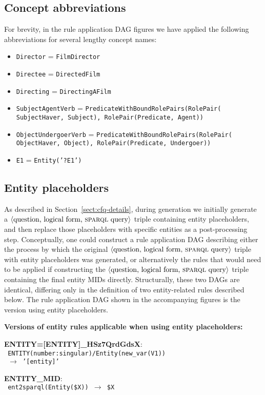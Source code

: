 \documentclass[letterpaper]{article}
\newcommand{\myparagraph}[1]{\textbf{#1}~}
\newcommand{\SPARQL}{\textsc{sparql}}
\begin{document}
\subsection{Concept abbreviations}

For brevity, in the rule application DAG figures we have applied the following abbreviations for several lengthy concept names:

\begin{itemize}
    \item \texttt{Director} = \texttt{FilmDirector}
    \item \texttt{Directee} = \texttt{DirectedFilm}
    \item \texttt{Directing} = \texttt{DirectingAFilm}
    \item \texttt{SubjectAgentVerb} = \texttt{PredicateWithBoundRolePairs(RolePair( SubjectHaver, Subject), RolePair(Predicate, Agent))}
    \item \texttt{ObjectUndergoerVerb} = \texttt{PredicateWithBoundRolePairs(RolePair( ObjectHaver, Object), RolePair(Predicate, Undergoer))}
    \item \texttt{E1} = \texttt{Entity('?E1')}
\end{itemize}

\subsection{Entity placeholders}

As described in Section~\ref{sect:cfq-details}, during generation we initially generate a $\langle \text{question, logical form, \SPARQL{} query} \rangle$ triple containing entity placeholders, and then replace those placeholders with specific entities as a post-processing step. Conceptually, one could construct a rule application DAG describing either the process by which the original $\langle \text{question, logical form, \SPARQL{} query} \rangle$ triple with entity placeholders was generated, or alternatively the rules that would need to be applied if constructing the $\langle \text{question, logical form, \SPARQL{} query} \rangle$ triple containing the final entity MIDs directly. Structurally, these two DAGs are identical, differing only in the definition of two entity-related rules described below. The rule application DAG shown in the accompanying figures is the version using entity placeholders.

\myparagraph{Versions of entity rules applicable when using entity placeholders:}

\begin{flushleft}
\small{
    \noindent \textbf{ENTITY=[ENTITY]\_HSz7QrdGdsX}: \\
    \texttt{
    ENTITY(number:singular)/Entity(new\_var(V1)) \\
    ~$\rightarrow$ '[entity]'
    }
    
    \noindent \textbf{ENTITY\_MID}: \\
    \texttt{
    ent2sparql(Entity(\$X)) $\rightarrow$ \$X
    }
}
\end{flushleft}
\end{document}
